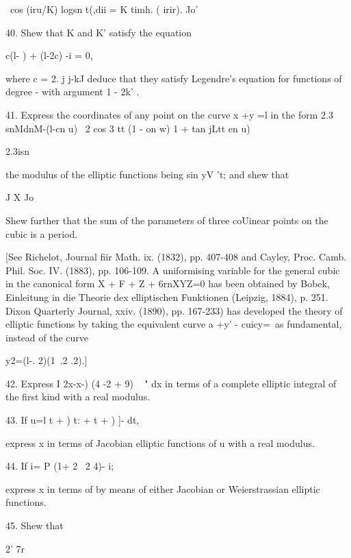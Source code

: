 \ cos (iru/K) logsn t(,dii = K timh. ( irir). Jo'


40. Shew that K and K' satisfy the equation

c(l- ) + (l-2c) -i = 0,

where c = 2. j j-kJ deduce that they satisfy Legendre's equation for
functions of degree - with argument 1 - 2k' .

%
%

41. Express the coordinates of any point on the curve x +y =l in the
form 2.3 snMdnM-(l-cn u) \ 2 cos 3 tt (1 - on w) 1 + tan jLtt en u)

2.3isn%

the modulus of the elliptic functions being sin yV 't; and shew that

J X Jo

Shew further that the sum of the parameters of three coUinear points
on the cubic is a period.

[See Richelot, Journal fiir Math. ix. (1832), pp. 407-408 and Cayley,
Proc. Camb. Phil. Soc. IV. (1883), pp. 106-109. A uniformising
variable for the general cubic in the canonical form X + F + Z +
6rnXYZ=0 has been obtained by Bobek, Einleitung in die Theorie dex
elliptischen Funktionen (Leipzig, 1884), p. 251. Dixon Quarterly
Journal, xxiv. (1890), pp. 167-233) has developed the theory of
elliptic functions by taking the equivalent curve a +y' - cuicy=\ as
fundamental, instead of the curve

y2=(l-. 2)(1\ .2 .2).]

42. Express I 2x-x-) (4 -2 + 9) ~ " dx in terms of a complete elliptic
integral of the first kind with a real modulus. 

43. If u=l t + ) t: + t + ) ]- dt,

express x in terms of Jacobian elliptic functions of u with a real
modulus.


44. If i= P (1+ 2 \ 2 4)- i;

express x in terms of by means of either Jacobian or Weierstrassian
elliptic functions.


45. Shew that

2' 7r


